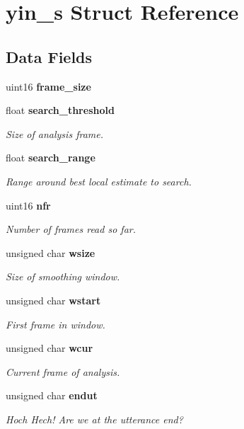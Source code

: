 \section{yin\+\_\+s Struct Reference}
\label{structyin__s}
\subsection*{Data Fields}
\begin{DoxyCompactItemize}
\item 
\mbox{\label{structyin__s_a25a7e0400397ab1fcbf82f4d0568722a}} 
uint16 {\bfseries frame\+\_\+size}
\item 
float \textbf{ search\+\_\+threshold}
\begin{DoxyCompactList}\small\item\em Size of analysis frame. \end{DoxyCompactList}\item 
\mbox{\label{structyin__s_a6dd2dda40ad048fa8be8a21cf59ca77b}} 
float \textbf{ search\+\_\+range}
\begin{DoxyCompactList}\small\item\em Range around best local estimate to search. \end{DoxyCompactList}\item 
uint16 \textbf{ nfr}
\begin{DoxyCompactList}\small\item\em Number of frames read so far. \end{DoxyCompactList}\item 
unsigned char \textbf{ wsize}
\begin{DoxyCompactList}\small\item\em Size of smoothing window. \end{DoxyCompactList}\item 
unsigned char \textbf{ wstart}
\begin{DoxyCompactList}\small\item\em First frame in window. \end{DoxyCompactList}\item 
unsigned char \textbf{ wcur}
\begin{DoxyCompactList}\small\item\em Current frame of analysis. \end{DoxyCompactList}\item 
\mbox{\label{structyin__s_a61ca0fc8444a1bdde10aca37dc9f0f56}} 
unsigned char \textbf{ endut}
\begin{DoxyCompactList}\small\item\em Hoch Hech! Are we at the utterance end? \end{DoxyCompactList}\item 

\end{DoxyCompactItemize}
